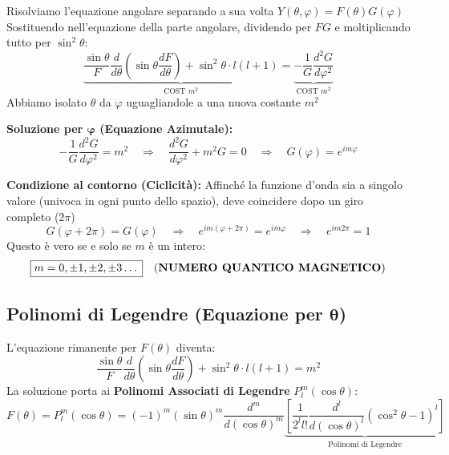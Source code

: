 \documentclass[11pt, a4paper]{article}
\begin{document}
Risolviamo l'equazione angolare separando a sua volta $Y(\theta,\varphi) = F(\theta)G(\varphi)$ %
Sostituendo nell'equazione della parte angolare, dividendo per $FG$ e moltiplicando tutto per $\sin^2\theta$: %
\begin{equation*}
    \underbrace{ \frac{\sin\theta}{F} \frac{d}{d\theta} \left( \sin\theta \frac{dF}{d\theta} \right) + \sin^2\theta \cdot l(l+1) }_{\text{COST } m^2} = \underbrace{ -\frac{1}{G} \frac{d^2 G}{d\varphi^2} }_{\text{COST } m^2} %
\end{equation*}
Abbiamo isolato $\theta$ da $\varphi$ uguagliandole a una nuova costante $m^2$ %

\noindent
\textbf{Soluzione per $\mathbf{\varphi}$ (Equazione Azimutale):} %
\begin{equation*}
    -\frac{1}{G} \frac{d^2 G}{d\varphi^2} = m^2 \quad \Rightarrow \quad \frac{d^2 G}{d\varphi^2} + m^2 G = 0 \quad \Rightarrow \quad G(\varphi) = e^{im\varphi} %
\end{equation*}

\noindent
\textbf{Condizione al contorno (Ciclicità):} Affinché la funzione d'onda sia a singolo valore (univoca in ogni punto dello spazio), deve coincidere dopo un giro completo ($2\pi$) %
\begin{equation*}
    G(\varphi + 2\pi) = G(\varphi) \quad \Rightarrow \quad e^{im(\varphi + 2\pi)} = e^{im\varphi} \quad \Rightarrow \quad e^{im2\pi} = 1 %
\end{equation*}
Questo è vero se e solo se $m$ è un intero: %
\begin{equation}
    \boxed{ m = 0, \pm 1, \pm 2, \pm 3 \dots } \quad \text{(\textbf{NUMERO QUANTICO MAGNETICO})} %
\end{equation}

\subsection{Polinomi di Legendre (Equazione per $\mathbf{\theta}$)} %

L'equazione rimanente per $F(\theta)$ diventa: %
\begin{equation*}
    \frac{\sin\theta}{F} \frac{d}{d\theta} \left( \sin\theta \frac{dF}{d\theta} \right) + \sin^2\theta \cdot l(l+1) = m^2 %
\end{equation*}
La soluzione porta ai \textbf{Polinomi Associati di Legendre} $P_l^m(\cos\theta)$: %
\begin{equation}
    F(\theta) = P_l^m(\cos\theta) = (-1)^m (\sin\theta)^m \frac{d^m}{d(\cos\theta)^m} \underbrace{ \left[ \frac{1}{2^l l!} \frac{d^l}{d(\cos\theta)^l} (\cos^2\theta - 1)^l \right] }_{\text{Polinomi di Legendre}} %
\end{equation}
\end{document}
